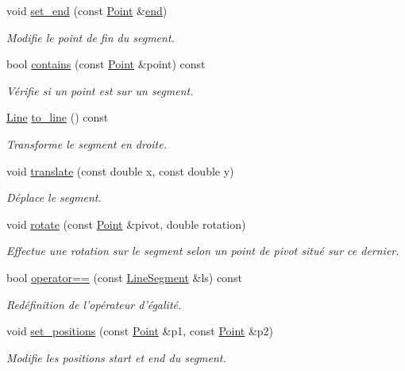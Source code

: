 \begin{DoxyCompactItemize}
void \hyperlink{classLineSegment_a8c001c5c898d912a9c6ecaba79a2cca3}{set\+\_\+end} (const \hyperlink{classPoint}{Point} \&\hyperlink{classLineSegment_a0852438c18570f230b6c6be1571b9460}{end})
\begin{DoxyCompactList}\small\item\em Modifie le point de fin du segment. \end{DoxyCompactList}\item 
bool \hyperlink{classLineSegment_a372c33eaea8eabc2e0a3e4f909f986dd}{contains} (const \hyperlink{classPoint}{Point} \&point) const 
\begin{DoxyCompactList}\small\item\em Vérifie si un point est sur un segment. \end{DoxyCompactList}\item 
\hyperlink{classLine}{Line} \hyperlink{classLineSegment_a0ca1dd12099a8629a67d5398f02e2529}{to\+\_\+line} () const 
\begin{DoxyCompactList}\small\item\em Transforme le segment en droite. \end{DoxyCompactList}\item 
void \hyperlink{classLineSegment_aedbd77b1d455613ea243fccfcdcf05fe}{translate} (const double x, const double y)
\begin{DoxyCompactList}\small\item\em Déplace le segment. \end{DoxyCompactList}\item 
void \hyperlink{classLineSegment_adf66b05ee5a1b034d8172848f9425943}{rotate} (const \hyperlink{classPoint}{Point} \&pivot, double rotation)
\begin{DoxyCompactList}\small\item\em Effectue une rotation sur le segment selon un point de pivot situé sur ce dernier. \end{DoxyCompactList}\item 
bool \hyperlink{classLineSegment_a74ef8c6e8a6c3c32250ae56cb76b23fe}{operator==} (const \hyperlink{classLineSegment}{Line\+Segment} \&ls) const 
\begin{DoxyCompactList}\small\item\em Redéfinition de l'opérateur d'égalité. \end{DoxyCompactList}\item 
void \hyperlink{classLineSegment_a8c10acc2f581a9c118069446bc37a56e}{set\+\_\+positions} (const \hyperlink{classPoint}{Point} \&p1, const \hyperlink{classPoint}{Point} \&p2)
\begin{DoxyCompactList}\small\item\em Modifie les positions start et end du segment. \end{DoxyCompactList}\end{DoxyCompactItemize}


